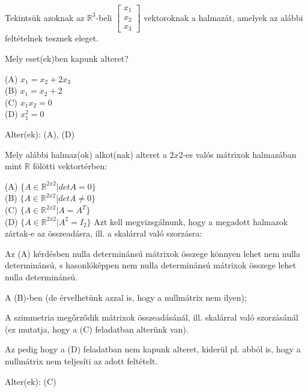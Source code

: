 \begin{frame}
  \begin{tcolorbox}[title={2/3. {\symrook}}]
      Tekintsük azoknak az $\mathbb{R}^3$-beli $\begin{bmatrix} 
  				x_1  \\
  				x_2 \\
  				x_3
			\end{bmatrix}$ vektoroknak a halmazát, amelyek az alábbi feltételnek tesznek eleget.\\
	  \mmedskip
      
      Mely eset(ek)ben kapunk alteret?\\
      \mmedskip
      
      (A) $x_1 = x_2 + 2x_3$\\
      (B) $x_1 = x_2 + 2$\\
      (C) $x_1x_2 = 0$\\
      (D) $x^2_1 = 0$
  \tcblower

    \mmedskip
    
    Alter(ek): (A), (D)
  \end{tcolorbox}
\end{frame}

\begin{frame}
  \begin{tcolorbox}[title={2/4. {\symqueen}}]
      Mely alábbi halmaz(ok) alkot(nak) alteret a $2x2$-es valós mátrixok halmazában mint $\mathbb{R}$ fölötti vektortérben:\\
      \mmedskip
      
      (A) $\{A \in \mathbb{R}^{2 x 2}|detA = 0\}$\\
      (B) $\{A \in \mathbb{R}^{2 x 2}|detA \neq 0\}$\\
      (C) $\{A \in \mathbb{R}^{2 x 2}|A = A^T\}$\\
      (D) $\{A \in \mathbb{R}^{2 x 2}|A^2 = I_2\}$
  \tcblower
    Azt kell megvizsgálnunk, hogy a megadott halmazok zártak-e az összeadásra, ill. a skalárral való szorzásra:\\
    \mmedskip

    Az (A) kérdésben nulla determinánsú mátrixok összege könnyen lehet nem nulla determinánsú, s hasonlóképpen nem nulla determinánsú mátrixok összege lehet nulla determinánsú.\\
    \mmedskip
    
    A (B)-ben (de érvelhetünk azzal is, hogy a nullmátrix nem ilyen);\\
    \mmedskip

    A szimmetria megőrződik mátrixok összeadásánál, ill. skalárral való szorzásánál (ez mutatja, hogy a (C) feladatban alterünk van).\\
    \mmedskip

    Az pedig hogy a (D) feladatban nem kapunk alteret, kiderül pl. abból is, hogy a nullmátrix nem teljesíti az adott feltételt.\\
    \mmedskip 
    
    Alter(ek): (C)
  \end{tcolorbox}
\end{frame}

